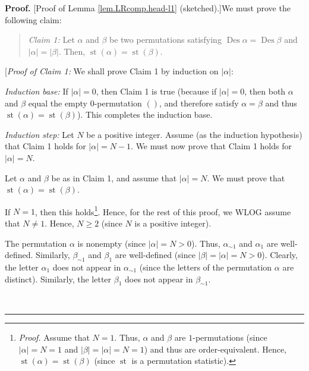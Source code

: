 \documentclass[numbers=enddot,12pt,final,onecolumn,notitlepage]{scrartcl}%
\theoremstyle{definition}
\newenvironment{statement}{\begin{quote}}{\end{quote}}
\newenvironment{proof}[1][Proof]{\noindent\textbf{#1.} }{\ \rule{0.5em}{0.5em}}
\begin{document}
\begin{proof}
[Proof of Lemma \ref{lem.LRcomp.head-l1} (sketched).]We must prove the
following claim:

\begin{statement}
\textit{Claim 1:} Let $\alpha$ and $\beta$ be two permutations satisfying
$\operatorname*{Des}\alpha=\operatorname*{Des}\beta$ and $\left\vert
\alpha\right\vert =\left\vert \beta\right\vert $. Then, $\operatorname*{st}%
\left(  \alpha\right)  =\operatorname*{st}\left(  \beta\right)  $.
\end{statement}

[\textit{Proof of Claim 1:} We shall prove Claim 1 by induction on $\left\vert
\alpha\right\vert $:

\textit{Induction base:} If $\left\vert \alpha\right\vert =0$, then Claim 1 is
true (because if $\left\vert \alpha\right\vert =0$, then both $\alpha$ and
$\beta$ equal the empty $0$-permutation $\left(  {}\right)  $, and therefore
satisfy $\alpha=\beta$ and thus $\operatorname*{st}\left(  \alpha\right)
=\operatorname*{st}\left(  \beta\right)  $). This completes the induction base.

\textit{Induction step:} Let $N$ be a positive integer. Assume (as the
induction hypothesis) that Claim 1 holds for $\left\vert \alpha\right\vert
=N-1$. We must now prove that Claim 1 holds for $\left\vert \alpha\right\vert
=N$.

Let $\alpha$ and $\beta$ be as in Claim 1, and assume that $\left\vert
\alpha\right\vert =N$. We must prove that $\operatorname*{st}\left(
\alpha\right)  =\operatorname*{st}\left(  \beta\right)  $.

If $N=1$, then this holds\footnote{\textit{Proof.} Assume that $N=1$. Thus,
$\alpha$ and $\beta$ are $1$-permutations (since $\left\vert \alpha\right\vert
=N=1$ and $\left\vert \beta\right\vert =\left\vert \alpha\right\vert =N=1$)
and thus are order-equivalent. Hence, $\operatorname*{st}\left(
\alpha\right)  =\operatorname*{st}\left(  \beta\right)  $ (since
$\operatorname*{st}$ is a permutation statistic).}. Hence, for the rest of
this proof, we WLOG assume that $N\neq1$. Hence, $N\geq2$ (since $N$ is a
positive integer).

The permutation $\alpha$ is nonempty (since $\left\vert \alpha\right\vert
=N>0$). Thus, $\alpha_{\sim1}$ and $\alpha_{1}$ are well-defined. Similarly,
$\beta_{\sim1}$ and $\beta_{1}$ are well-defined (since $\left\vert
\beta\right\vert =\left\vert \alpha\right\vert =N>0$). Clearly, the letter
$\alpha_{1}$ does not appear in $\alpha_{\sim1}$ (since the letters of the
permutation $\alpha$ are distinct). Similarly, the letter $\beta_{1}$ does not
appear in $\beta_{\sim1}$.


\end{proof}
\end{document}
